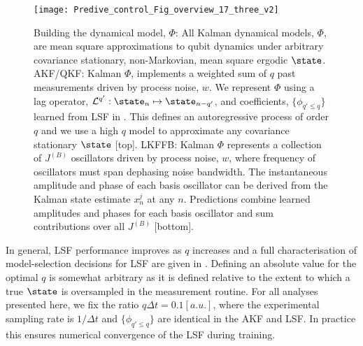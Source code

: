 \begin{figure} [tp]
    \texttt{[image: Predive\_control\_Fig\_overview\_17\_three\_v2]}
    \caption{\label{Predive_control_Fig_overview_17_three} Building the dynamical model, $\Phi$: All Kalman dynamical models, $\Phi$, are mean square approximations to qubit dynamics under arbitrary covariance stationary, non-Markovian, mean square ergodic $\state$. AKF/QKF: Kalman $\Phi$, implements a weighted sum of $q$ past measurements driven by process noise, $w$. We represent $\Phi$ using a lag operator, $\mathcal{L}^{q'}: \state_n \mapsto \state_{n-q'}$, and coefficients, $ \{ \phi_{q' \leq q} \}$ learned from LSF in \cite{mavadia2017}. This defines an autoregressive process of order $q$ and we use a high $q$ model to approximate any covariance stationary $\state$ [top]. LKFFB: Kalman $\Phi$ represents a collection of $J^{(B)}$ oscillators driven by process noise, $w$, where frequency of oscillators must span dephasing noise bandwidth. The instantaneous amplitude and phase of each basis oscillator can be derived from the Kalman state estimate $x^j_n$ at any $n$. Predictions combine learned amplitudes and phases for each basis oscillator and sum contributions over all $J^{(B)}$ [bottom].}
\end{figure}

In general, LSF performance improves as $q$ increases and a full characterisation of model-selection decisions for LSF are given in \cite{mavadia2017}. Defining an absolute value for the optimal $q$ is somewhat arbitrary as it is defined relative to the extent to which a true $\state$ is oversampled in the measurement routine. For all analyses presented here, we fix the ratio $q \Delta t = 0.1 [a.u.]$, where the experimental sampling rate is $1/\Delta t$ and $\{\phi_{q' \leq q}\}$ are identical in the AKF and LSF.   In practice this ensures numerical convergence of the LSF during training.

